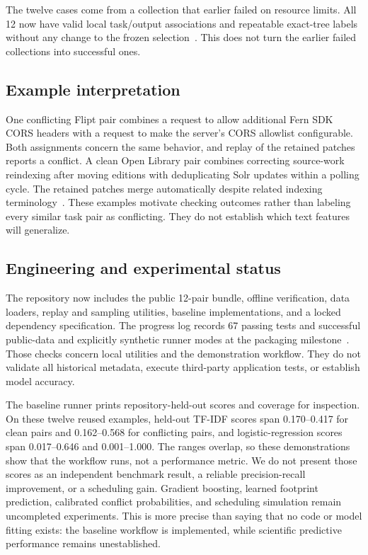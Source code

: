 \documentclass[sigconf,authorversion,nonacm]{acmart}
\begin{document}
The twelve cases come from a collection that earlier failed on resource limits. All 12 now have valid local task/output associations and repeatable exact-tree labels without any change to the frozen selection~\cite{recoveryresults}. This does not turn the earlier failed collections into successful ones.

\subsection{Example interpretation}
One conflicting Flipt pair combines a request to allow additional Fern SDK CORS headers with a request to make the server's CORS allowlist configurable. Both assignments concern the same behavior, and replay of the retained patches reports a conflict. A clean Open Library pair combines correcting source-work reindexing after moving editions with deduplicating Solr updates within a polling cycle. The retained patches merge automatically despite related indexing terminology~\cite{publicdataset}. These examples motivate checking outcomes rather than labeling every similar task pair as conflicting. They do not establish which text features will generalize.

\subsection{Engineering and experimental status}
The repository now includes the public 12-pair bundle, offline verification, data loaders, replay and sampling utilities, baseline implementations, and a locked dependency specification. The progress log records 67 passing tests and successful public-data and explicitly synthetic runner modes at the packaging milestone~\cite{projectprogress}. Those checks concern local utilities and the demonstration workflow. They do not validate all historical metadata, execute third-party application tests, or establish model accuracy.

The baseline runner prints repository-held-out scores and coverage for inspection. On these twelve reused examples, held-out TF-IDF scores span 0.170--0.417 for clean pairs and 0.162--0.568 for conflicting pairs, and logistic-regression scores span 0.017--0.646 and 0.001--1.000. The ranges overlap, so these demonstrations show that the workflow runs, not a performance metric. We do not present those scores as an independent benchmark result, a reliable precision-recall improvement, or a scheduling gain. Gradient boosting, learned footprint prediction, calibrated conflict probabilities, and scheduling simulation remain uncompleted experiments. This is more precise than saying that no code or model fitting exists: the baseline workflow is implemented, while scientific predictive performance remains unestablished.
\end{document}
